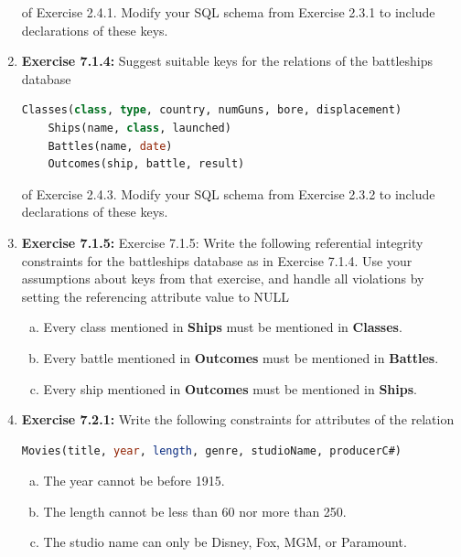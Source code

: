\documentclass[12pt]{article}
\begin{document}
\begin{enumerate}[1.]
    \bigskip

    of Exercise 2.4.1. Modify your SQL schema from Exercise 2.3.1 to include
    declarations of these keys.

    \item \textbf{Exercise 7.1.4:} Suggest suitable keys for the relations of the battleships
    database

    \bigskip

    \begin{lstlisting}[language=SQL]
    Classes(class, type, country, numGuns, bore, displacement)
    Ships(name, class, launched)
    Battles(name, date)
    Outcomes(ship, battle, result)
    \end{lstlisting}

    \bigskip

    of Exercise 2.4.3. Modify your SQL schema from Exercise 2.3.2 to include
    declarations of these keys.

    \item \textbf{Exercise 7.1.5:} Exercise 7.1.5: Write the following referential
    integrity constraints for the battleships database as in Exercise 7.1.4. Use
    your assumptions about keys from that exercise, and handle all violations by
    setting the referencing attribute value to NULL

    \begin{enumerate}[a)]
        \item Every class mentioned in \textbf{Ships} must be mentioned in \textbf{Classes}.
        \item Every battle mentioned in \textbf{Outcomes} must be mentioned in \textbf{Battles}.
        \item Every ship mentioned in \textbf{Outcomes} must be mentioned in \textbf{Ships}.
    \end{enumerate}

    \item \textbf{Exercise 7.2.1:} Write the following constraints for attributes of the relation

    \begin{lstlisting}[language=SQL]
    Movies(title, year, length, genre, studioName, producerC#)
    \end{lstlisting}

    \bigskip

    \begin{enumerate}[a)]
        \item The year cannot be before 1915.
        \item The length cannot be less than 60 nor more than 250.
        \item The studio name can only be Disney, Fox, MGM, or Paramount.
    \end{enumerate}


\end{enumerate}
\end{document}
